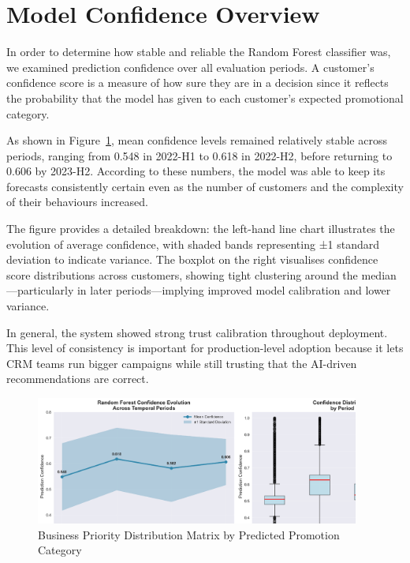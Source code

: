 \documentclass[12pt,a4paper]{report}
\begin{document}
\section*{Model Confidence Overview}

In order to determine how stable and reliable the Random Forest classifier was, we examined prediction confidence over all evaluation periods.  A customer's confidence score is a measure of how sure they are in a decision since it reflects the probability that the model has given to each customer's expected promotional category.

As shown in Figure~\ref{fig:model-confidence}, mean confidence levels remained relatively stable across periods, ranging from 0.548 in 2022-H1 to 0.618 in 2022-H2, before returning to 0.606 by 2023-H2. According to these numbers, the model was able to keep its forecasts consistently certain even as the number of customers and the complexity of their behaviours increased.

The figure provides a detailed breakdown: the left-hand line chart illustrates the evolution of average confidence, with shaded bands representing ±1 standard deviation to indicate variance. The boxplot on the right visualises confidence score distributions across customers, showing tight clustering around the median—particularly in later periods—implying improved model calibration and lower variance.

In general, the system showed strong trust calibration throughout deployment. This level of consistency is important for production-level adoption because it lets CRM teams run bigger campaigns while still trusting that the AI-driven recommendations are correct.


\begin{figure}[H]
\centering
\includegraphics[width=0.95\textwidth]{figures/model_confidence.png}
\caption{Business Priority Distribution Matrix by Predicted Promotion Category}
\label{fig:model-confidence}
\end{figure}
\end{document}
